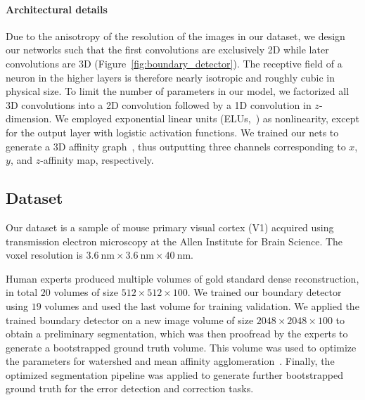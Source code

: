 \documentclass{article}
\begin{document}
\paragraph{Architectural details} Due to the anisotropy of the resolution of the
images in our dataset, we design our networks such that the first convolutions
are exclusively 2D while later convolutions are 3D
(Figure~\ref{fig:boundary_detector}). The receptive field of a neuron in the
higher layers is therefore nearly isotropic and roughly cubic in physical size.
To limit the number of parameters in our model, we factorized all 3D
convolutions into a 2D convolution followed by a 1D convolution in
$z$-dimension. We employed exponential linear units (ELUs,~\cite{elu}) as
nonlinearity, except for the output layer with logistic activation functions. We
trained our nets to generate a 3D affinity
graph~\cite{boundary_detection,kisuk,funke2017deep}, thus outputting three
channels corresponding to $x$, $y$, and $z$-affinity map, respectively.

\subsection{Dataset}
Our dataset is a sample of mouse primary visual cortex (V1) acquired using
transmission electron microscopy at the Allen Institute for Brain Science. The
voxel resolution is $3.6~\text{nm} \times 3.6~\text{nm} \times 40~\text{nm}$.

Human experts produced multiple volumes of gold standard dense reconstruction,
in total $20$ volumes of size $512 \times 512 \times 100$. We trained our
boundary detector using $19$ volumes and used the last volume for training
validation. We applied the trained boundary detector on a new image volume of
size $2048 \times 2048 \times 100$ to obtain a preliminary segmentation, which
was then proofread by the experts to generate a bootstrapped ground truth
volume. This volume was used to optimize the parameters for watershed and mean
affinity agglomeration~\cite{kisuk}. Finally, the optimized segmentation
pipeline was applied to generate further bootstrapped ground truth for the error
detection and correction tasks.
\end{document}
